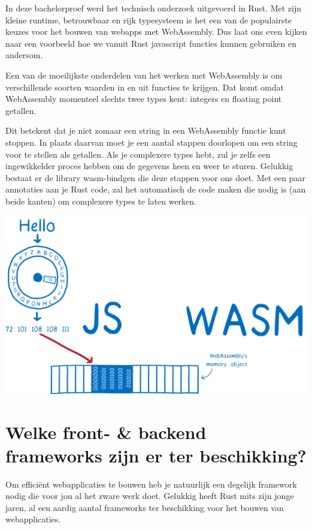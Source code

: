 In deze bachelorproef werd het technisch onderzoek uitgevoerd in Rust. Met zijn kleine runtime,
betrouwbaar en rijk typesysteem is het een van de populairste keuzes voor het bouwen van webapps met
WebAssembly. Dus laat ons even kijken naar een voorbeeld hoe we vanuit Rust javascript functies
kunnen gebruiken en andersom.

Een van de moeilijkste onderdelen van het werken met WebAssembly is om verschillende soorten waarden
in en uit functies te krijgen. Dat komt omdat WebAssembly momenteel slechts twee types kent:
integers en floating point getallen. 

Dit betekent dat je niet zomaar een string in een WebAssembly functie kunt stoppen. In plaats
daarvan moet je een aantal stappen doorlopen om een string voor te stellen als getallen. Als je
complexere types hebt, zul je zelfs een ingewikkelder proces hebben om de gegevens heen en weer te
sturen. Gelukkig bestaat er de library wasm-bindgen die deze stappen voor ons doet. Met een paar
annotaties aan je Rust code, zal het automatisch de code maken die nodig is (aan beide kanten) om
complexere types te laten werken.

\includegraphics[width=\textwidth]{./figures/wasm_bindgen.png}

\section{Welke front- \& backend frameworks zijn er ter beschikking?}

Om efficiënt webapplicaties te bouwen heb je natuurlijk een degelijk framework nodig die voor jou al
het zware werk doet. Gelukkig heeft Rust mits zijn jonge jaren, al een aardig aantal frameworks ter
beschikking voor het bouwen van webapplicaties.  

